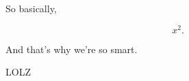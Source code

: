 \documentclass{article}
\begin{document}
  So basically,

  \begin{equation}
    x^2.
  \end{equation}

  And that's why we're so smart.

  LOLZ
\end{document}
